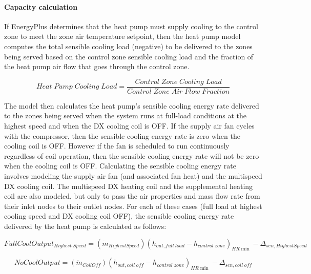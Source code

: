 \paragraph{Capacity calculation}\label{capacity-calculation}

If EnergyPlus determines that the heat pump must supply cooling to the control zone to meet the zone air temperature setpoint, then the heat pump model computes the total sensible cooling load (negative) to be delivered to the zones being served based on the control zone sensible cooling load and the fraction of the heat pump air flow that goes through the control zone.

\begin{equation}
Heat\;Pump\;Cooling\;Load = \frac{{Control\;Zone\;Cooling\;Load}}{{Control\;Zone\;Air\;Flow\;Fraction}}
\end{equation}

The model then calculates the heat pump's sensible cooling energy rate delivered to the zones being served when the system runs at full-load conditions at the highest speed and when the DX cooling coil is OFF. If the supply air fan cycles with the compressor, then the sensible cooling energy rate is zero when the cooling coil is OFF. However if the fan is scheduled to run continuously regardless of coil operation, then the sensible cooling energy rate will not be zero when the cooling coil is OFF. Calculating the sensible cooling energy rate involves modeling the supply air fan (and associated fan heat) and the multispeed DX cooling coil. The multispeed DX heating coil and the supplemental heating coil are also modeled, but only to pass the air properties and mass flow rate from their inlet nodes to their outlet nodes. For each of these cases (full load at highest cooling speed and DX cooling coil OFF), the sensible cooling energy rate delivered by the heat pump is calculated as follows:

\begin{equation}
FullCoolOutpu{t_{Highest\;Speed}} = \left( {{{\dot m}_{HighestSpeed}}} \right){\left( {{h_{out,full\;load}} - {h_{control\;zone}}} \right)_{HR\min }} - {\Delta_{sen,HighestSpeed}}
\end{equation}

\begin{equation}
NoCoolOutput = \left( {{{\dot m}_{CoilOff}}} \right){\left( {{h_{out,coil\;off}} - {h_{control\;zone}}} \right)_{HR\min }} - {\Delta_{sen,coil\;off}}
\end{equation}

